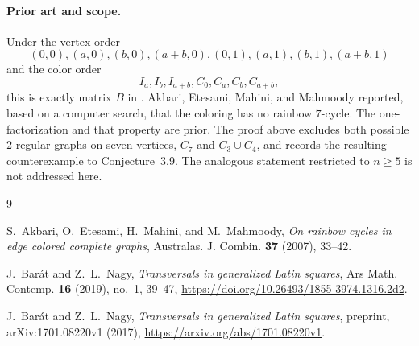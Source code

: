 \documentclass[11pt]{amsart}
\begin{document}
\paragraph{Prior art and scope.}
Under the vertex order
\[
 (0,0),(a,0),(b,0),(a+b,0),(0,1),(a,1),(b,1),(a+b,1)
\]
and the color order
\[
 I_a,I_b,I_{a+b},C_0,C_a,C_b,C_{a+b},
\]
this is exactly matrix $B$ in \cite{AEMM}.  Akbari, Etesami, Mahini, and
Mahmoody reported, based on a computer search, that the coloring has no
rainbow $7$-cycle.  The one-factorization and that property are prior.
The proof above excludes both possible $2$-regular graphs on seven
vertices, $C_7$ and $C_3\cup C_4$, and records the resulting
counterexample to Conjecture~3.9.  The analogous statement restricted to
$n\ge5$ is not addressed here.

\begin{thebibliography}{9}

S.~Akbari, O.~Etesami, H.~Mahini, and M.~Mahmoody,
\emph{On rainbow cycles in edge colored complete graphs},
Australas. J. Combin. \textbf{37} (2007), 33--42.

J.~Bar\'at and Z.~L.~Nagy,
\emph{Transversals in generalized Latin squares},
Ars Math. Contemp. \textbf{16} (2019), no.~1, 39--47,
\url{https://doi.org/10.26493/1855-3974.1316.2d2}.

J.~Bar\'at and Z.~L.~Nagy,
\emph{Transversals in generalized Latin squares},
preprint, arXiv:1701.08220v1 (2017),
\url{https://arxiv.org/abs/1701.08220v1}.

\end{thebibliography}
\end{document}
